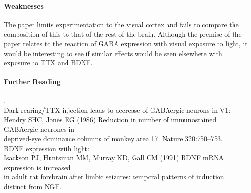 \documentclass[11pt]{article}
\begin{document}
\paragraph{Weaknesses}
The paper limits experimentation to the visual cortex and fails to compare the composition
of this to that of the rest of the brain. Although the premise of the paper relates
to the reaction of GABA expression with visual exposure to light, it would be interesting
to see if similar effects would be seen elsewhere with exposure to TTX and BDNF.

\paragraph{Further Reading} \tiny{.}\\
\normalsize
Dark-rearing/TTX injection leads to decrease of GABAergic neurons in V1: \\
\hspace*{0.5in}Hendry SHC, Jones EG (1986) Reduction in number of immunostained GABAergic neurones
in \\
\hspace*{0.5in}deprived-eye dominance columns of monkey area 17. Nature 320:750–753. \\
BDNF expression with light: \\
\hspace*{0.5in} Isackson PJ, Huntsman MM, Murray KD, Gall CM (1991) BDNF mRNA expression is increased \\
\hspace*{0.5in} in adult rat forebrain after limbic seizures: temporal patterns of induction distinct from NGF.\\
\end{document}
